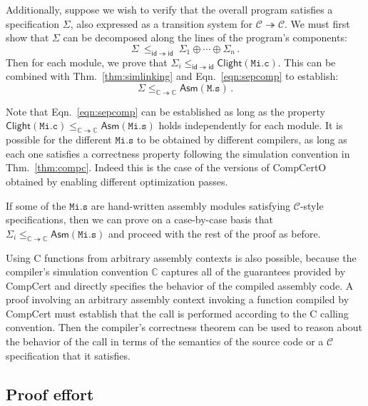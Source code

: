 \documentclass[acmsmall,authordraft]{acmart}
\newcommand{\kw}[1]{\ensuremath{ \mathsf{#1} }}
\begin{document}
Additionally,
suppose we wish to verify that the overall program
satisfies a specification $\Sigma$,
also expressed as a transition system
for $\mathcal{C} \twoheadrightarrow \mathcal{C}$.
We must first show that $\Sigma$ can be decomposed
along the lines of the program's components:
\[
    \Sigma \: \le_{\kw{id} \twoheadrightarrow \kw{id}} \:
    \Sigma_1 \oplus \cdots \oplus \Sigma_n \,.
\]
Then for each module, we prove that
$\Sigma_i \le_{\kw{id} \twoheadrightarrow \kw{id}} \kw{Clight}(\mathtt{Mi.c})$.
This can be combined with Thm.~\ref{thm:simlinking} and Eqn.~\ref{eqn:sepcomp}
to establish:
\[
    \Sigma \le_{\mathbb{C} \twoheadrightarrow \mathbb{C}} \kw{Asm}(\mathtt{M.s}) \,.
\]

Note that Eqn.~\ref{eqn:sepcomp} can be established
as long as the property
$\kw{Clight}(\mathtt{Mi.c})
 \le_{\mathbb{C} \twoheadrightarrow \mathbb{C}}
 \kw{Asm}(\mathtt{Mi.s})$
holds independently for each module.
It is possible for the different $\mathtt{Mi.s}$
to be obtained by different compilers,
as long as each one satisfies a correctness property
following the simulation convention in Thm.~\ref{thm:compc}.
Indeed this is the case of the versions of CompCertO
obtained by enabling different optimization passes.

If some of the $\mathtt{Mi.s}$
are hand-written assembly modules satisfying
$\mathcal{C}$-style specifications,
then we can prove on a case-by-case basis that
$\Sigma_i \le_{\mathbb{C} \twoheadrightarrow \mathbb{C}} \kw{Asm}(\mathtt{Mi.s})$
and proceed with the rest of the proof as before.

Using C functions from
arbitrary assembly contexts is also possible,
because the compiler's simulation convention $\mathbb{C}$
captures all of the guarantees provided by CompCert and
directly specifies the behavior of the compiled assembly code.
A proof involving an arbitrary assembly context
invoking a function compiled by CompCert
must establish that the call is performed
according to the C calling convention.
Then the compiler's correctness theorem
can be used to reason about the behavior of the call
in terms of the semantics of the source code
or a $\mathcal{C}$ specification that it satisfies.


\subsection{Proof effort} \label{sec:effort} %
\end{document}
